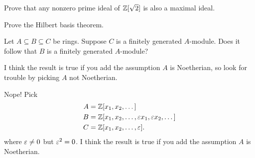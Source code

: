 \begin{sproblem}
	Prove that any nonzero prime ideal of $\mathbb Z[\sqrt 2]$ is also a maximal ideal.
	\label{prob:dedekind_sample}
\end{sproblem}

\begin{problem}
	\gim
	Prove the Hilbert basis theorem.
\end{problem}

\begin{problem} %
	\gim
	Let $A \subseteq B \subseteq C$ be rings.
	Suppose $C$ is a finitely generated $A$-module.
	Does it follow that $B$ is a finitely generated $A$-module?
	\begin{hint}
		I think the result is true if you add the assumption $A$ is Noetherian,
		so look for trouble by picking $A$ not Noetherian.
	\end{hint}
	\begin{sol}
		Nope! Pick
		\begin{align*}
			A &= \mathbb Z[x_1, x_2, \dots] \\
			B &= \mathbb Z[x_1, x_2, \dots, \varepsilon x_1, \varepsilon x_2, \dots] \\
			C &= \mathbb Z[x_1, x_2, \dots, \varepsilon].
		\end{align*}
		where $\varepsilon \neq 0$ but $\varepsilon^2 = 0$.
		I think the result is true if you add the assumption $A$ is Noetherian.
	\end{sol}
\end{problem}
